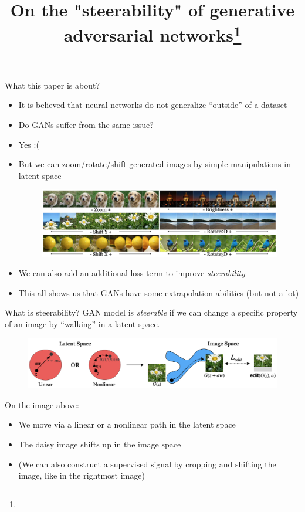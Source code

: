 \documentclass[10pt]{beamer}
\title{On the "steerability" of generative adversarial networks\footnote{\citepaper{GAN_steerability}}}
\begin{document}
\begin{frame}
    \titlepage
\end{frame}

\begin{frame}{What this paper is about?}
    \begin{itemize}
        \item\pause It is believed that neural networks do not generalize ``outside'' of a dataset
        \item\pause Do GANs suffer from the same issue?
        \item\pause Yes :(
        \item\pause But we can zoom/rotate/shift generated images by simple manipulations in latent space
\begin{figure}
    \centering
    \includegraphics[width=\textwidth]{images/gan-steerability-examples.png}
\end{figure}
        \item\pause We can also add an additional loss term to improve \textit{steerability}
        \item\pause This all shows us that GANs have some extrapolation abilities (but not a lot)
    \end{itemize}    
\end{frame}

\begin{frame}{What is steerability?}
    \pause
    GAN model is \textit{steerable} if we can change a specific property of an image by ``walking'' in a latent space.
    
    \begin{figure}
        \centering
        \includegraphics[width=\textwidth]{images/gan-steerability-walking-example.png}
    \end{figure}
    
    On the image above:
    \begin{itemize}
        \item\pause We move via a linear or a nonlinear path in the latent space
        \item\pause The daisy image shifts up in the image space
        \item\pause (We can also construct a supervised signal by cropping and shifting the image, like in the rightmost image)
    \end{itemize}
\end{frame}
\end{document}
